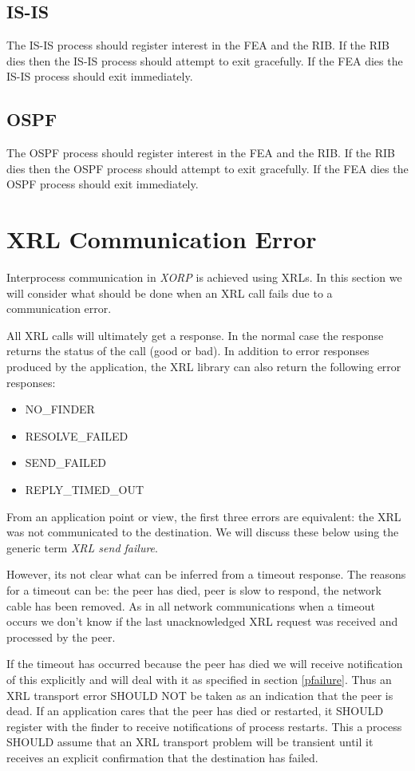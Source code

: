 \documentclass[11pt]{article}
\makeatletter
\newcommand{\xorp} {{\em XORP}\@\xspace}
\makeatother
\begin{document}
\subsection{IS-IS}

The IS-IS process should register interest in the FEA and the RIB. If
the RIB dies then the IS-IS process should attempt to exit gracefully.
If the FEA dies the IS-IS process should exit immediately.

\subsection{OSPF}

The OSPF process should register interest in the FEA and the RIB. If
the RIB dies then the OSPF process should attempt to exit gracefully.
If the FEA dies the OSPF process should exit immediately.

\section{XRL Communication Error}
Interprocess communication in \xorp is achieved using XRLs. In this
section we will consider what should be done when an XRL call fails
due to a communication error.

All XRL calls will ultimately get a response. In the normal case the
response returns the status of the call (good or bad). In addition to
error responses produced by the application, the XRL library can also
return the following error responses:
\begin{itemize}
\item NO\_FINDER
\item RESOLVE\_FAILED
\item SEND\_FAILED
\item REPLY\_TIMED\_OUT
\end{itemize}
From an application point or view, the first three errors are
equivalent: the XRL was not communicated to the destination.  We will
discuss these below using the generic term {\em XRL send failure}.

However, its not clear what can be inferred from a timeout
response. The reasons for a timeout can be: the peer has died, peer is
slow to respond, the network cable has been removed. As in all network
communications when a timeout occurs we don't know if the last
unacknowledged XRL request was received and processed by the peer.

If the timeout has occurred because the peer has died we will receive
notification of this explicitly and will deal with it as specified in
section \ref{pfailure}.  Thus an XRL transport error SHOULD NOT be
taken as an indication that the peer is dead.  If an application cares
that the peer has died or restarted, it SHOULD register with the
finder to receive notifications of process restarts.  This a process
SHOULD assume that an XRL transport problem will be transient until it
receives an explicit confirmation that the destination has failed. 
\end{document}
